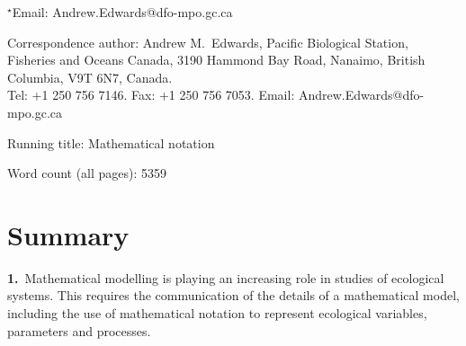 \documentclass[12pt]{article}
\author{ANDREW M.~EDWARDS$^{1,2}$ and MARIE AUGER-M\'ETH\'E$^{3,4}$}
\date{}
\newcommand{\wordcount}{}  %
\begin{document}

\vspace{7mm}


\medskip


\noindent $^\star$Email: Andrew.Edwards@dfo-mpo.gc.ca


\medskip

\noindent Correspondence author: Andrew M.~Edwards, Pacific Biological Station,
Fisheries and Oceans Canada, 3190 Hammond Bay Road, Nanaimo, British Columbia,
V9T 6N7, Canada.\\
Tel: +1 250 756 7146. Fax: +1 250 756 7053. Email:
Andrew.Edwards@dfo-mpo.gc.ca


\medskip

\noindent Running title: Mathematical notation %
 
\medskip

\noindent Word count (all pages): 5359   %


\clearpage

\section*{Summary}


{\bf 1.}~Mathematical modelling is playing an increasing role
in studies of ecological systems.
This requires the communication of the details of a mathematical model,
including the use of mathematical notation to represent
ecological variables, parameters and processes. 
\end{document}
